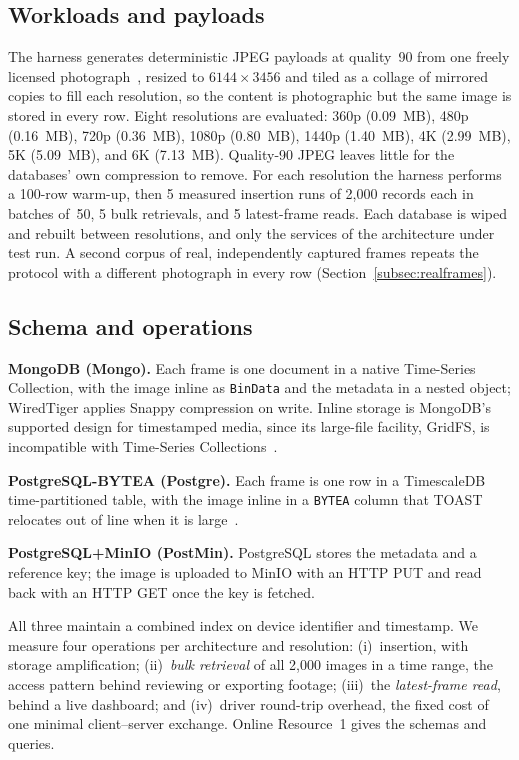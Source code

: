 \documentclass[pdflatex,sn-basic]{sn-jnl}%
\begin{document}
\subsection{Workloads and payloads}\label{subsec:workloads}
{\color{markup}The harness generates deterministic JPEG payloads at quality~90 from one freely licensed photograph~\citep{pexels_durdle_door}, resized to $6144\times3456$ and tiled as a collage of mirrored copies to fill each resolution, so the content is photographic but the same image is stored in every row.} {\color{markup}Eight resolutions are evaluated: 360p (0.09~MB), 480p (0.16~MB), 720p (0.36~MB), 1080p (0.80~MB), 1440p (1.40~MB), 4K (2.99~MB), 5K (5.09~MB), and 6K (7.13~MB).} {\color{markup}Quality-90 JPEG leaves little for the databases' own compression to remove.} {\color{markup}For each resolution the harness performs a 100-row warm-up, then 5 measured insertion runs of 2{,}000 records each in batches of~50, 5 bulk retrievals, and 5 latest-frame reads.} {\color{markup}Each database is wiped and rebuilt between resolutions, and only the services of the architecture under test run.} {\color{markup}A second corpus of real, independently captured frames repeats the protocol with a different photograph in every row (Section~\ref{subsec:realframes}).}

\subsection{Schema and operations}\label{subsec:schema}
{\color{markup}\textbf{MongoDB (Mongo).} Each frame is one document in a native Time-Series Collection, with the image inline as \texttt{BinData} and the metadata in a nested object; WiredTiger applies Snappy compression on write.} {\color{markup}Inline storage is MongoDB's supported design for timestamped media, since its large-file facility, GridFS, is incompatible with Time-Series Collections~\citep{mongodb_ts_limitations}.}

{\color{markup}\textbf{PostgreSQL-BYTEA (Postgre).} Each frame is one row in a TimescaleDB time-partitioned table, with the image inline in a \texttt{BYTEA} column that TOAST relocates out of line when it is large~\citep{postgresql_toast_docs}.}

{\color{markup}\textbf{PostgreSQL+MinIO (PostMin).} PostgreSQL stores the metadata and a reference key; the image is uploaded to MinIO with an HTTP PUT and read back with an HTTP GET once the key is fetched.}

{\color{markup}All three maintain a combined index on device identifier and timestamp.} {\color{markup}We measure four operations per architecture and resolution: (i)~insertion, with storage amplification; (ii)~\emph{bulk retrieval} of all 2{,}000 images in a time range, the access pattern behind reviewing or exporting footage; (iii)~the \emph{latest-frame read}, behind a live dashboard; and (iv)~driver round-trip overhead, the fixed cost of one minimal client--server exchange.} {\color{markup}Online Resource~1 gives the schemas and queries.}
\end{document}

